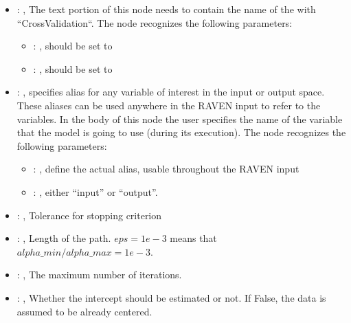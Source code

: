 \begin{itemize}
    \item {}: , 
      The text portion of this node needs to contain the name of the  with
               ``CrossValidation``.
      The  node recognizes the following parameters:
        \begin{itemize}
          \item {}: , 
            should be set to 
          \item {}: , 
            should be set to 
      \end{itemize}

    \item {}: , 
      specifies alias for         any variable of interest in the input or output space. These
      aliases can be used anywhere in the RAVEN input to         refer to the variables. In the body
      of this node the user specifies the name of the variable that the model is going to use
      (during its execution).
      The  node recognizes the following parameters:
        \begin{itemize}
          \item {}: , 
            define the actual alias, usable throughout the RAVEN input
          \item {}: , 
            either ``input'' or ``output''.
      \end{itemize}

    \item {}: , 
      Tolerance for stopping criterion

    \item {}: , 
      Length of the path. $eps=1e-3$ means that
      $alpha\_min / alpha\_max = 1e-3$.

    \item {}: , 
      The maximum number of iterations.

    \item {}: , 
      Whether the intercept should be estimated or not. If False,
      the data is assumed to be already centered.


\end{itemize}
